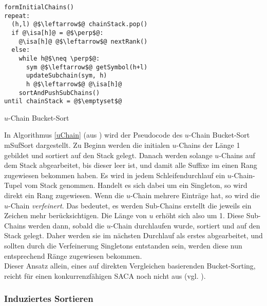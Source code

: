 \begin{listing}[htp]
\begin{verbatim}
formInitialChains()
repeat:
  (h,l) @$\leftarrow$@ chainStack.pop()	
  if @\isa[h]@ = @$\perp$@:
    @\isa[h]@ @$\leftarrow$@ nextRank()		
  else:
    while h@$\neq \perp$@:
      sym @$\leftarrow$@ getSymbol(h+l)
      updateSubchain(sym, h)
      h @$\leftarrow$@ @\isa[h]@
    sortAndPushSubChains()	
until chainStack = @$\emptyset$@			
\end{verbatim}
\caption{$u$-Chain Bucket-Sort}
\label{uChain}
\end{listing}

In Algorithmus \ref{uChain} (aus \cite{Maniscalco}) wird der Pseudocode des $u$-Chain Bucket-Sort mSufSort dargestellt.
Zu Beginn werden die initialen $u$-Chains der Länge 1 gebildet und sortiert auf den Stack gelegt. Danach werden solange $u$-Chains auf dem Stack abgearbeitet, bis dieser leer ist, und damit alle Suffixe im \isa einen Rang zugewiesen bekommen haben.
Es wird in jedem Schleifendurchlauf ein $u$-Chain-Tupel vom Stack genommen. Handelt es sich dabei um ein Singleton, so wird direkt ein Rang zugewiesen. Wenn die $u$-Chain mehrere Einträge hat, so wird die $u$-Chain \textit{verfeinert}. Das bedeutet, es werden Sub-Chains erstellt die jeweils ein Zeichen mehr berücksichtigen. Die Länge von $u$ erhöht sich also um 1. Diese Sub-Chains werden dann, sobald die $u$-Chain durchlaufen wurde, sortiert und auf den Stack gelegt. Daher werden sie im nächsten Durchlauf als erstes abgearbeitet, und sollten durch die Verfeinerung Singletons entstanden sein, werden diese nun entsprechend Ränge zugewiesen bekommen.\\

Dieser Ansatz allein, eines auf direkten Vergleichen basierenden Bucket-Sorting, reicht für einen konkurrenzfähigen SACA noch nicht aus (vgl. \cite{seward2000}).

\subsubsection{Induziertes Sortieren}

